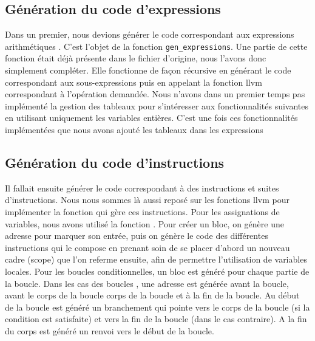 \documentclass[french]{article}
\begin{document}
  \subsection{Génération du code d'expressions}
Dans un premier, nous devions générer le code correspondant aux expressions arithmétiques . C'est l'objet de la fonction \texttt{gen_expressions}. Une partie de cette fonction était déjà présente dans le fichier d'origine, nous l'avons donc simplement compléter. Elle fonctionne de façon récursive en générant le code correspondant aux sous-expressions puis en appelant la fonction llvm correspondant à l'opération demandée. Nous n'avons dans un premier temps pas implémenté la gestion des tableaux pour s’intéresser aux fonctionnalités suivantes en utilisant uniquement les variables entières. C'est une fois ces fonctionnalités implémentées que nous avons ajouté les tableaux dans les expressions
  \subsection{Génération du code d'instructions}
Il fallait ensuite générer le code correspondant à des instructions et suites d'instructions. Nous nous sommes là aussi reposé sur les fonctions llvm pour implémenter la fonction  qui gère ces instructions. Pour les assignations de variables, nous avons utilisé la fonction . Pour créer un bloc, on génère une adresse pour marquer son entrée, puis on génère le code des différentes instructions qui le compose en prenant soin de se placer d'abord un nouveau cadre (scope) que l'on referme ensuite, afin de permettre l'utilisation de variables locales. Pour les boucles conditionnelles, un bloc est généré pour chaque partie de la boucle.
Dans les cas des boucles , une adresse est générée avant la boucle, avant le corps de la boucle corps de la boucle et à la fin de la boucle. Au début de la boucle est généré un branchement qui pointe vers le corps de la boucle (si la condition est satisfaite) et vers la fin de la boucle (dans le cas contraire). A la fin du corps est généré un renvoi vers le début de la boucle.
\end{document}
